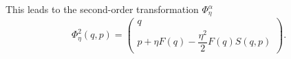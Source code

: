 %
This leads to the second-order transformation $\Phi_\eta^\alpha$
%
\begin{equation}
	\Phi_\eta^2(q,p) = 
	\begin{pmatrix}
 	  q \\ p + \eta F(q) - \dfrac{\eta^2}{2}F(q)S(q,p)
 	\end{pmatrix}.
\end{equation}
%

